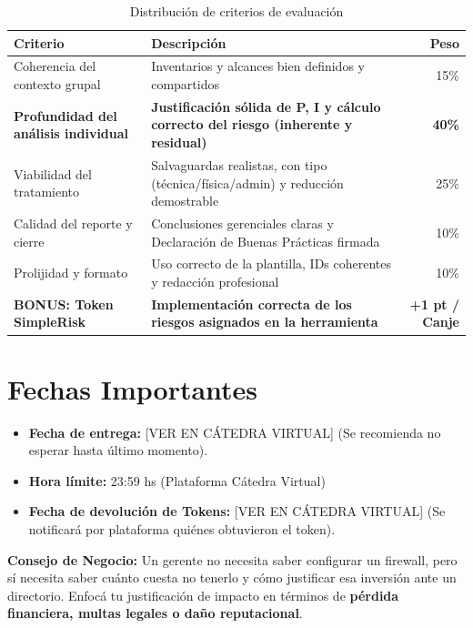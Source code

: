 \documentclass[11pt,a4paper]{article}
\begin{document}
\begin{table}[ht!]
\centering
\renewcommand{\arraystretch}{1.3}
    \begin{tabularx}{\textwidth}{@{}l>{\raggedright\arraybackslash}Xr@{}}
\toprule
\textbf{Criterio} & \textbf{Descripción} & \textbf{Peso} \\
\midrule
Coherencia del contexto grupal & Inventarios y alcances bien definidos y compartidos & 15\% \\
\textbf{Profundidad del análisis individual} & \textbf{Justificación sólida de P, I y cálculo correcto del riesgo (inherente y residual)} & \textbf{40\%} \\
Viabilidad del tratamiento & Salvaguardas realistas, con tipo (técnica/física/admin) y reducción demostrable & 25\% \\
Calidad del reporte y cierre & Conclusiones gerenciales claras y Declaración de Buenas Prácticas firmada & 10\% \\
Prolijidad y formato & Uso correcto de la plantilla, IDs coherentes y redacción profesional & 10\% \\
\midrule
\textbf{BONUS: Token SimpleRisk} & \textbf{Implementación correcta de los riesgos asignados en la herramienta} & \textbf{+1 pt / Canje} \\
\bottomrule
\end{tabularx}
\caption{Distribución de criterios de evaluación}
\end{table}

\section{Fechas Importantes}

\begin{infobox}
\begin{itemize}
    \item \textbf{Fecha de entrega:} [VER EN CÁTEDRA VIRTUAL] (Se recomienda no esperar hasta último momento).
    \item \textbf{Hora límite:} 23:59 hs (Plataforma Cátedra Virtual)
    \item \textbf{Fecha de devolución de Tokens:} [VER EN CÁTEDRA VIRTUAL] (Se notificará por plataforma quiénes obtuvieron el token).
\end{itemize}
\end{infobox}

\begin{tipbox}
\textbf{Consejo de Negocio:} Un gerente no necesita saber configurar un firewall, pero sí necesita saber cuánto cuesta no tenerlo y cómo justificar esa inversión ante un directorio. Enfocá tu justificación de impacto en términos de \textbf{pérdida financiera, multas legales o daño reputacional}.
\end{tipbox}
\end{document}
